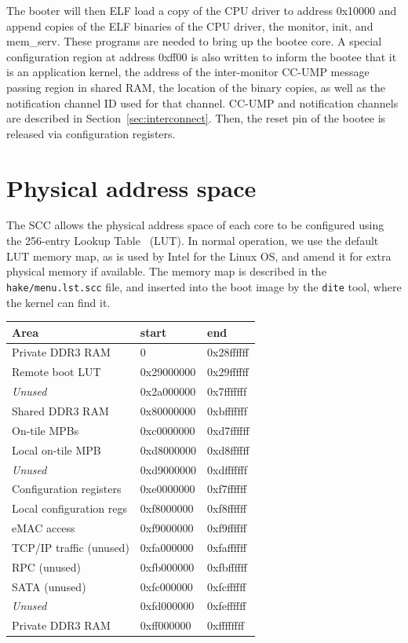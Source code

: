 \documentclass[a4paper,twoside]{report} %
\begin{document}
The booter will then ELF load a copy of the CPU driver to address
0x10000 and append copies of the ELF binaries of the CPU driver, the
monitor, init, and mem\_serv. These programs are needed to bring up
the bootee core. A special configuration region at address 0xff00 is
also written to inform the bootee that it is an application kernel,
the address of the inter-monitor CC-UMP message passing region in
shared RAM, the location of the binary copies, as well as the
notification channel ID used for that channel. CC-UMP and notification
channels are described in Section~\ref{sec:interconnect}.  Then, the
reset pin of the bootee is released via configuration registers.

\section{Physical address space}

The SCC allows the physical address space of each core to be
configured using the 256-entry Lookup Table~\cite{rockcreek_eas}
(LUT).  In normal operation, we use the default LUT memory map, as is
used by Intel for the Linux OS, and amend it for extra physical memory
if available. The memory map is described in the
\verb+hake/menu.lst.scc+ file, and inserted into the boot image by the
\verb+dite+ tool, where the kernel can find it.

\begin{center}
\begin{tabular}{lll}
Area & start & end\\
\hline
Private DDR3 RAM & 0 & 0x28ffffff \\
Remote boot LUT & 0x29000000 & 0x29ffffff \\
\emph{Unused} & 0x2a000000 & 0x7fffffff \\
Shared DDR3 RAM & 0x80000000 & 0xbfffffff \\
On-tile MPBs & 0xc0000000 & 0xd7ffffff \\
Local on-tile MPB & 0xd8000000 & 0xd8ffffff \\
\emph{Unused} & 0xd9000000 & 0xdfffffff \\
Configuration registers & 0xe0000000 & 0xf7ffffff \\
Local configuration regs & 0xf8000000 & 0xf8ffffff \\
eMAC access & 0xf9000000 & 0xf9ffffff \\
TCP/IP traffic (unused) & 0xfa000000 & 0xfaffffff \\
RPC (unused) & 0xfb000000 & 0xfbffffff \\
SATA (unused) & 0xfc000000 & 0xfcffffff \\
\emph{Unused} & 0xfd000000 & 0xfeffffff \\
Private DDR3 RAM & 0xff000000 & 0xffffffff \\
\end{tabular}
\end{center}
\end{document}
